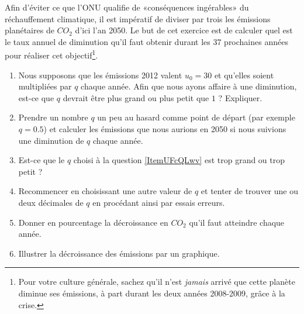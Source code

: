 
\begin{exercice}\label{exosmath-0304}

    Afin d'éviter ce que l'ONU qualifie de «conséquences ingérables» du réchauffement climatique, il est impératif de diviser par trois les émissions planétaires de \( CO_2\) d'ici l'an 2050\cite{KXZPUlP}. Le but de cet exercice est de calculer quel est le taux annuel de diminution qu'il faut obtenir durant les 37 prochaines années pour réaliser cet objectif\footnote{Pour votre culture générale, sachez qu'il n'est \emph{jamais} arrivé que cette planète diminue ses émissions, à part durant les deux années 2008-2009, grâce à la crise.}.

    \begin{enumerate}
        \item
            Nous supposons que les émissions 2012 valent \( u_0=\)\unit{30}{\giga\tonne}\cite{XZZqclR} et qu'elles soient multipliées par \( q\) chaque année. Afin que nous ayons affaire à une diminution, est-ce que \( q\) devrait être plus grand ou plus petit que \( 1\) ? Expliquer.
        \item   \label{ItemUFcQLwv}
            Prendre un nombre \( q\) un peu au hasard comme point de départ (par exemple \( q=0.5\)) et calculer les émissions que nous aurions en 2050 si nous suivions une diminution de \( q\) chaque année.
        \item
            Est-ce que le \( q\) choisi à la question \ref{ItemUFcQLwv} est trop grand ou trop petit ?
        \item
            Recommencer en choisissant une autre valeur de \( q\) et tenter de trouver une ou deux décimales de \( q\) en procédant ainsi par essais erreurs.
        \item
            Donner en pourcentage la décroissance en \( CO_2\) qu'il faut atteindre chaque année.
        \item
            Illustrer la décroissance des émissions par un graphique.
    \end{enumerate}

\end{exercice}
